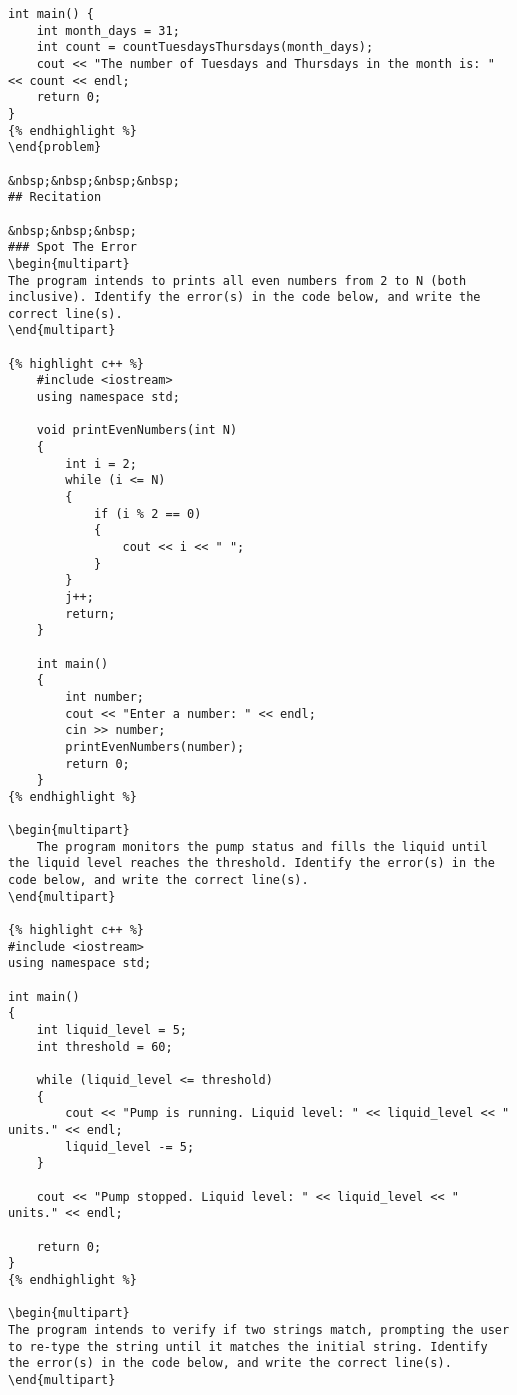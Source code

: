 {{{{{{{{{{\begin{problem}
\begin{verbatim}
int main() {
    int month_days = 31;
    int count = countTuesdaysThursdays(month_days);
    cout << "The number of Tuesdays and Thursdays in the month is: " << count << endl;
    return 0;
}
{% endhighlight %}
\end{problem}

&nbsp;&nbsp;&nbsp;&nbsp;
## Recitation

&nbsp;&nbsp;&nbsp;
### Spot The Error
\begin{multipart}
The program intends to prints all even numbers from 2 to N (both inclusive). Identify the error(s) in the code below, and write the correct line(s).
\end{multipart}

{% highlight c++ %}
    #include <iostream>
    using namespace std;
    
    void printEvenNumbers(int N)
    {
        int i = 2;   
        while (i <= N)
        {
            if (i % 2 == 0)
            {
                cout << i << " ";
            }
        }
        j++;
        return;
    }
    
    int main()
    {
        int number;
        cout << "Enter a number: " << endl;
        cin >> number;
        printEvenNumbers(number);
        return 0;
    }
{% endhighlight %}

\begin{multipart}
    The program monitors the pump status and fills the liquid until the liquid level reaches the threshold. Identify the error(s) in the code below, and write the correct line(s).
\end{multipart}

{% highlight c++ %}
#include <iostream>
using namespace std;

int main()
{
    int liquid_level = 5;
    int threshold = 60;

    while (liquid_level <= threshold)
    {
        cout << "Pump is running. Liquid level: " << liquid_level << " units." << endl;
        liquid_level -= 5;
    }

    cout << "Pump stopped. Liquid level: " << liquid_level << " units." << endl;

    return 0;
}
{% endhighlight %}

\begin{multipart}
The program intends to verify if two strings match, prompting the user to re-type the string until it matches the initial string. Identify the error(s) in the code below, and write the correct line(s).
\end{multipart}


\end{verbatim}
\end{problem}}}}}}}}}}}
